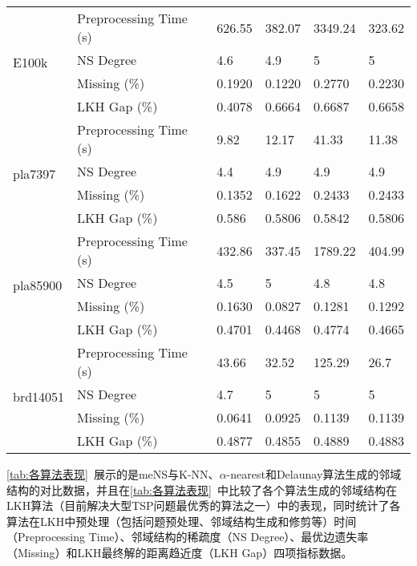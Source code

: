 \begin{longtable}[c]{llllll}
    \midrule
    \multirow{4}[2]{*}{E100k}  & Preprocessing Time (s) & 626.55 & 382.07 & 3349.24 & 323.62 \\
                & NS Degree       & 4.6    & 4.9    & 5       & 5      \\
                & Missing (\%)               & 0.1920  & 0.1220  & 0.2770  & 0.2230  \\
                & LKH Gap (\%)           & 0.4078 & 0.6664 & 0.6687  & 0.6658 \\
    \midrule
    \multirow{4}[2]{*}{pla7397}  & Preprocessing Time (s) & 9.82   & 12.17  & 41.33   & 11.38  \\
                & NS Degree       & 4.4    & 4.9    & 4.9     & 4.9    \\
                & Missing (\%)               & 0.1352  & 0.1622  & 0.2433  & 0.2433  \\
                & LKH Gap (\%)           & 0.586  & 0.5806 & 0.5842  & 0.5806 \\
    \midrule
    \multirow{4}[2]{*}{pla85900} & Preprocessing Time (s) & 432.86 & 337.45 & 1789.22 & 404.99 \\
                & NS Degree       & 4.5    & 5      & 4.8     & 4.8    \\
                & Missing (\%)               & 0.1630  & 0.0827  & 0.1281  & 0.1292  \\
                & LKH Gap (\%)           & 0.4701 & 0.4468 & 0.4774  & 0.4665 \\
    \midrule
    \multirow{4}[2]{*}{brd14051} & Preprocessing Time (s) & 43.66  & 32.52  & 125.29  & 26.7   \\
                & NS Degree       & 4.7    & 5      & 5       & 5      \\
                & Missing (\%)               & 0.0641  & 0.0925  & 0.1139  & 0.1139  \\
                & LKH Gap (\%)           & 0.4877 & 0.4855 & 0.4889  & 0.4883 \\
    \bottomrule
\end{longtable}
\par
\autoref{tab:各算法表现}~展示的是meNS与K-NN、$\alpha$-nearest和Delaunay算法生成的邻域结构的对比数据，并且在\autoref{tab:各算法表现}~中比较了各个算法生成的邻域结构在LKH算法\cite{helsgaun2000effective}（目前解决大型TSP问题最优秀的算法之一）中的表现，同时统计了各算法在LKH中预处理（包括问题预处理、邻域结构生成和修剪等）时间（Preprocessing Time）、邻域结构的稀疏度（NS Degree）、最优边遗失率（Missing）和LKH最终解的距离趋近度（LKH Gap）四项指标数据。

